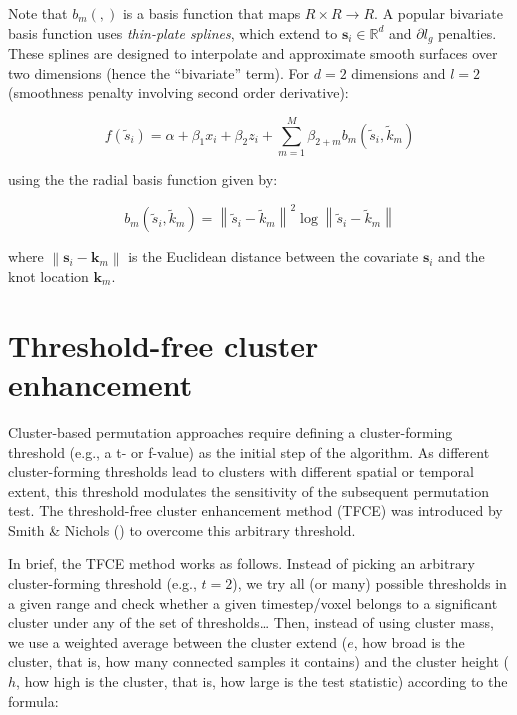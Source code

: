 \documentclass[
  doc,
  floatsintext,
  longtable,
  a4paper,
  nolmodern,
  notxfonts,
  notimes,
  colorlinks=true,linkcolor=blue,citecolor=blue,urlcolor=blue]{apa7}
\begin{document}
Note that \(b_{m}(,)\) is a basis function that maps
\(R \times R \rightarrow R\). A popular bivariate basis function uses
\emph{thin-plate splines}, which extend to
\(\mathbf{s}_{i} \in \mathbb{R}^{d}\) and \(\partial l_{g}\) penalties.
These splines are designed to interpolate and approximate smooth
surfaces over two dimensions (hence the ``bivariate'' term). For \(d=2\)
dimensions and \(l=2\) (smoothness penalty involving second order
derivative):

\[
f \left(\tilde{s}_{i} \right) = \alpha + \beta_{1} x_{i} + \beta_{2} z_{i} +\sum_{m=1}^{M} \beta_{2+m} b_m\left(\tilde{s}_i, \tilde{k}_m\right)
\]

using the the radial basis function given by:

\[
b_m\left(\tilde{s}_i, \tilde{k}_m\right)=\left\|\tilde{s}_i-\tilde{k}_m\right\|^2 \log \left\|\tilde{s}_i-\tilde{k}_m\right\|
\]

where \(\left\|\mathbf{s}_i-\mathbf{k}_{m}\right\|\) is the Euclidean
distance between the covariate \(\mathbf{s}_{i}\) and the knot location
\(\mathbf{k}_{m}\).

\newpage

\section{Threshold-free cluster
enhancement}\label{threshold-free-cluster-enhancement}

Cluster-based permutation approaches require defining a cluster-forming
threshold (e.g., a t- or f-value) as the initial step of the algorithm.
As different cluster-forming thresholds lead to clusters with different
spatial or temporal extent, this threshold modulates the sensitivity of
the subsequent permutation test. The threshold-free cluster enhancement
method (TFCE) was introduced by Smith \& Nichols
() to overcome this arbitrary threshold.

In brief, the TFCE method works as follows. Instead of picking an
arbitrary cluster-forming threshold (e.g., \(t=2\)), we try all (or
many) possible thresholds in a given range and check whether a given
timestep/voxel belongs to a significant cluster under any of the set of
thresholds\ldots{} Then, instead of using cluster mass, we use a
weighted average between the cluster extend (\(e\), how broad is the
cluster, that is, how many connected samples it contains) and the
cluster height (\(h\), how high is the cluster, that is, how large is
the test statistic) according to the formula:
\end{document}
